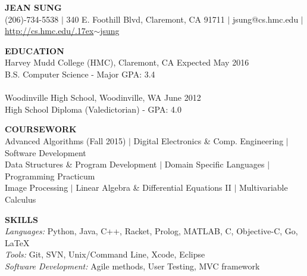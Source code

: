 \documentclass[11pt]{article}
\makeatletter
\newcommand{\selfName}{\Huge\textbf{JEAN SUNG}}
\newcommand{\addrA}{\small 340 E. Foothill Blvd, }
\newcommand{\addrB}{\small Claremont, CA 91711 }
\newcommand{\email}{\small{jsung@cs.hmc.edu }}
\newcommand{\phone}{\small (206)-734-5538 }
\newcommand{\tildeText}{\raise.17ex\hbox{$\scriptstyle\sim$}}
\newcommand{\websitedisplaytext}{\small http://cs.hmc.edu/\tildeText jsung }
\newcommand{\website}{\href{http://cs.hmc.edu/~jsung}{\websitedisplaytext}}
\newcommand{\vb}{ $\mid$ }
\newcommand{\sectionNL}{\\[-2pt]}
\newcommand{\HMC}{HMC}
\newcommand{\rightAlign}{\hfill}
\makeatother
\begin{document}
\begin{center}
\selfName\\
\phone \vb 
\addrA \addrB \vb
\email \vb
\website

\hrulefill
\end{center}

\vspace{-10pt}

\begin{flushleft}
{\textbf{EDUCATION}}  \sectionNL
Harvey Mudd College (\HMC), Claremont, CA \rightAlign Expected May 2016  \\
B.S. Computer Science - Major GPA: 3.4   \\~\\
Woodinville High School, Woodinville, WA \rightAlign June 2012 \\
High School Diploma (Valedictorian) - GPA: 4.0 
\end{flushleft}

\begin{flushleft}
{\textbf{COURSEWORK}} \sectionNL
Advanced Algorithms (Fall 2015)  \vb Digital Electronics \& Comp. Engineering\vb Software Development \\
Data Structures \& Program Development \vb Domain Specific Languages \vb Programming Practicum \\
Image Processing  \vb Linear Algebra \& Differential Equations II \vb Multivariable Calculus  \\

\end{flushleft}


\begin{flushleft}
{\textbf{SKILLS}} \sectionNL
\textit{Languages:} Python, Java, C++, Racket, Prolog, MATLAB, C, Objective-C, Go, \LaTeX \\
\textit{Tools:} Git, SVN, Unix/Command Line, Xcode, Eclipse \\ %
\textit{Software Development:} Agile methods, User Testing, MVC framework


\end{flushleft}
\end{document}
